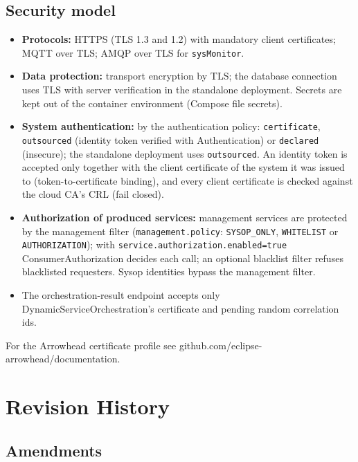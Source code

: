 \documentclass[a4paper]{arrowhead}
\begin{document}
\subsection{Security model}


\begin{itemize}
  \item \textbf{Protocols:} HTTPS (TLS 1.3 and 1.2) with mandatory client certificates; MQTT over TLS; AMQP over TLS for \texttt{sysMonitor}.
  \item \textbf{Data protection:} transport encryption by TLS; the database connection uses TLS with server verification in the standalone deployment. Secrets are kept out of the container environment (Compose file secrets).
  \item \textbf{System authentication:} by the authentication policy: \texttt{certificate}, \texttt{outsourced} (identity token verified with Authentication) or \texttt{declared} (insecure); the standalone deployment uses \texttt{outsourced}. An identity token is accepted only together with the client certificate of the system it was issued to (token-to-certificate binding), and every client certificate is checked against the cloud CA's CRL (fail closed).
  \item \textbf{Authorization of produced services:} management services are protected by the management filter (\texttt{management.policy}: \texttt{SYSOP\_ONLY}, \texttt{WHITELIST} or \texttt{AUTHORIZATION}); with \texttt{service.authorization.enabled=true} ConsumerAuthorization decides each call; an optional blacklist filter refuses blacklisted requesters. Sysop identities bypass the management filter.
  \item The orchestration-result endpoint accepts only Dynamic\allowbreak{}Service\allowbreak{}Orchestration's certificate and pending random correlation ids.
\end{itemize}

For the Arrowhead certificate profile see github.com/eclipse-arrowhead/documentation.





\newpage

\section{Revision History}
\subsection{Amendments}
\end{document}
